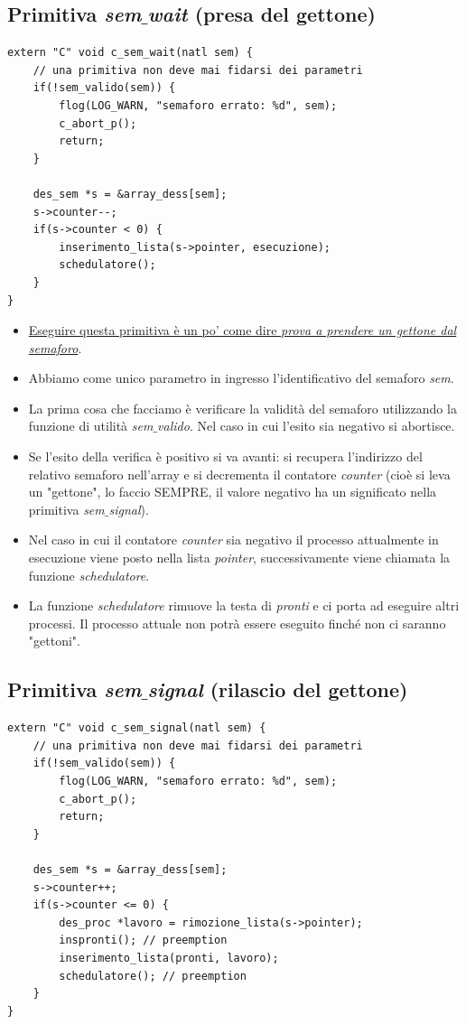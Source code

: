 \documentclass[11pt]{report}
\theoremstyle{definition}
\begin{document}
\subsection{Primitiva \emph{sem$\_$wait} (presa del gettone)} 
\small 
\begin{verbatim}
extern "C" void c_sem_wait(natl sem) {
    // una primitiva non deve mai fidarsi dei parametri
    if(!sem_valido(sem)) {
        flog(LOG_WARN, "semaforo errato: %d", sem);
        c_abort_p();
        return;
    }

    des_sem *s = &array_dess[sem];
    s->counter--;
    if(s->counter < 0) {
        inserimento_lista(s->pointer, esecuzione);
        schedulatore();
    }
}
\end{verbatim}
\normalsize 
\begin{itemize}
	\item \underline{Eseguire questa primitiva è un po' come dire \textit{prova a prendere un gettone dal semaforo}}. 
	\item Abbiamo come unico parametro in ingresso l'identificativo del semaforo \emph{sem}.
	\item La prima cosa che facciamo è verificare la validità del semaforo utilizzando la funzione di utilità \emph{sem$\_$valido}. Nel caso in cui l'esito sia negativo si abortisce.
	\item Se l'esito della verifica è positivo si va avanti: si recupera l'indirizzo del relativo semaforo nell'array e si decrementa il contatore \emph{counter} (cioè si leva un "gettone", lo faccio SEMPRE, il valore negativo ha un significato nella primitiva \emph{sem$\_$signal}).
	\item Nel caso in cui il contatore \emph{counter} sia negativo il processo attualmente in esecuzione viene posto nella lista \emph{pointer}, successivamente viene chiamata la funzione \emph{schedulatore}.
	\item La funzione \emph{schedulatore} rimuove la testa di \emph{pronti} e ci porta ad eseguire altri processi. Il processo attuale non potrà essere eseguito finché non ci saranno "gettoni".
\end{itemize}
\subsection{Primitiva \emph{sem$\_$signal} (rilascio del gettone)}
\small 
\begin{verbatim}
extern "C" void c_sem_signal(natl sem) {
    // una primitiva non deve mai fidarsi dei parametri
    if(!sem_valido(sem)) {
        flog(LOG_WARN, "semaforo errato: %d", sem);
        c_abort_p();
        return;
    }

    des_sem *s = &array_dess[sem];
    s->counter++;
    if(s->counter <= 0) {
        des_proc *lavoro = rimozione_lista(s->pointer);
        inspronti(); // preemption
        inserimento_lista(pronti, lavoro);
        schedulatore(); // preemption
    }
}
\end{verbatim}
\normalsize  %
\end{document}
